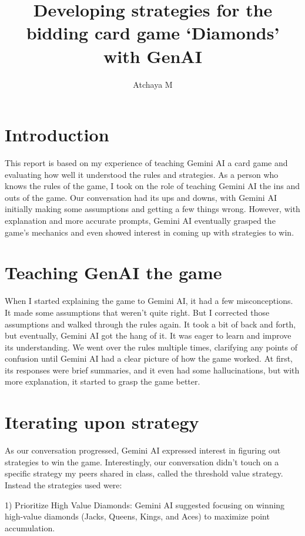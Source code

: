 \documentclass[12pt,a4]{article}
\begin{document}
\title{Developing strategies for the bidding card game `Diamonds' with GenAI}


\author{Atchaya M}
\maketitle


\section{Introduction}
This report is based on my experience of teaching Gemini AI a card game and evaluating how well it understood the rules and strategies. As a person who knows the rules of the game, I took on the role of teaching Gemini AI the ins and outs of the game. Our conversation had its ups and downs, with Gemini AI initially making some assumptions and getting a few things wrong. However, with explanation and more accurate prompts, Gemini AI eventually grasped the game's mechanics and even showed interest in coming up with strategies to win.

\section{Teaching GenAI the game}
When I started explaining the game to Gemini AI, it had a few misconceptions. It made some assumptions that weren't quite right. But I corrected those assumptions and walked through the rules again. It took a bit of back and forth, but eventually, Gemini AI got the hang of it. It was eager to learn and improve its understanding. We went over the rules multiple times, clarifying any points of confusion until Gemini AI had a clear picture of how the game worked. At first, its responses were brief summaries, and it even had some hallucinations, but with more explanation, it started to grasp the game better.

\section{Iterating upon strategy}
As our conversation progressed, Gemini AI expressed interest in figuring out strategies to win the game. Interestingly, our conversation didn't touch on a specific strategy my peers shared in class, called the threshold value strategy.
Instead the strategies used were:

1) Prioritize High Value Diamonds: Gemini AI suggested focusing on winning high-value diamonds (Jacks, Queens, Kings, and Aces) to maximize point accumulation.
\end{document}
